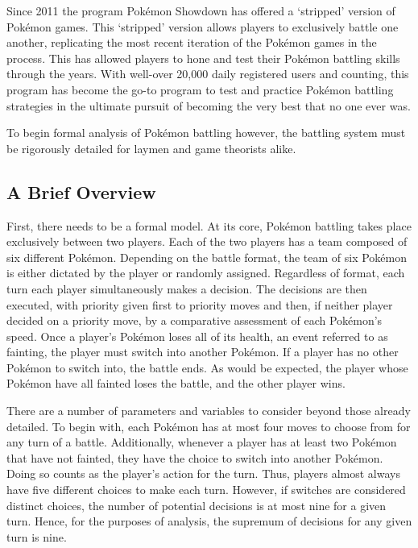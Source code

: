\documentclass[12pt,twoside]{reedthesis}
\begin{document}
  Since 2011 the program Pokémon Showdown has offered a `stripped' version
  of Pokémon games. This `stripped' version allows players to exclusively
  battle one another, replicating the most recent iteration of the Pokémon
  games in the process. This has allowed players to hone and test their
  Pokémon battling skills through the years. With well-over 20,000 daily
  registered users and counting, this program has become the go-to program
  to test and practice Pokémon battling strategies in the ultimate pursuit
  of becoming the very best that no one ever was.
  
  To begin formal analysis of Pokémon battling however, the battling
  system must be rigorously detailed for laymen and game theorists alike.
  
  \subsection{A Brief Overview}\label{a-brief-overview}
  
  First, there needs to be a formal model. At its core, Pokémon battling
  takes place exclusively between two players. Each of the two players has
  a team composed of six different Pokémon. Depending on the battle
  format, the team of six Pokémon is either dictated by the player or
  randomly assigned. Regardless of format, each turn each player
  simultaneously makes a decision. The decisions are then executed, with
  priority given first to priority moves and then, if neither player
  decided on a priority move, by a comparative assessment of each
  Pokémon's speed. Once a player's Pokémon loses all of its health, an
  event referred to as fainting, the player must switch into another
  Pokémon. If a player has no other Pokémon to switch into, the battle
  ends. As would be expected, the player whose Pokémon have all fainted
  loses the battle, and the other player wins.
  
  There are a number of parameters and variables to consider beyond those
  already detailed. To begin with, each Pokémon has at most four moves to
  choose from for any turn of a battle. Additionally, whenever a player
  has at least two Pokémon that have not fainted, they have the choice to
  switch into another Pokémon. Doing so counts as the player's action for
  the turn. Thus, players almost always have five different choices to
  make each turn. However, if switches are considered distinct choices,
  the number of potential decisions is at most nine for a given turn.
  Hence, for the purposes of analysis, the supremum of decisions for any
  given turn is nine.
  
\end{document}
